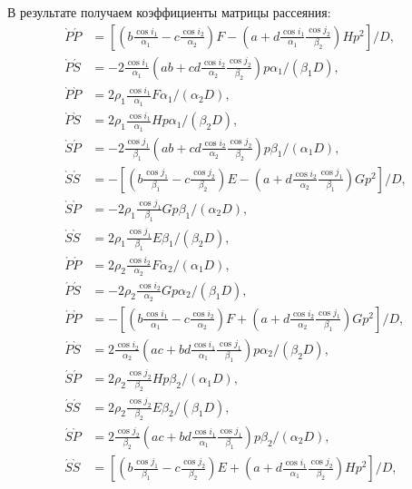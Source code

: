 В результате получаем коэффициенты матрицы рассеяния:
\begin{align}
\grave{P}\acute{P} &= [ ( b\frac{\cos{i_1}}{\alpha_1} - c\frac{\cos{i_2}}{\alpha_2} )F - ( a + d\frac{\cos{i_1}}{\alpha_1}\frac{\cos{j_2}}{\beta_2} )Hp^2 ] / D, \nonumber\\
\grave{P}\acute{S} &= -2 \frac{\cos{i_1}}{\alpha_1} (ab + cd \frac{\cos{i_2}}{\alpha_2} \frac{\cos{j_2}}{\beta_2} ) p \alpha_1 / (\beta_1 D), \nonumber\\
\grave{P}\grave{P} &= 2 \rho_1 \frac{\cos{i_1}}{\alpha_1} F \alpha_1 / (\alpha_2 D), \nonumber\\
\grave{P}\grave{S} &= 2 \rho_1 \frac{\cos{i_1}}{\alpha_1} H p \alpha_1 / (\beta_2 D), \nonumber\\
\grave{S}\acute{P} &= -2 \frac{\cos{j_1}}{\beta_1} (ab + cd \frac{\cos{i_2}}{\alpha_2} \frac{\cos{j_2}}{\beta_2} ) p \beta_1 / (\alpha_1 D), \nonumber\\
\grave{S}\acute{S} &= - [ ( b\frac{\cos{j_1}}{\beta_1} - c\frac{\cos{j_2}}{\beta_2} )E - ( a + d\frac{\cos{i_2}}{\alpha_2}\frac{\cos{j_1}}{\beta_1} )Gp^2 ] / D, \nonumber\\
\grave{S}\grave{P} &= - 2 \rho_1 \frac{\cos{j_1}}{\beta_1} Gp \beta_1 / (\alpha_2 D), \nonumber\\
\grave{S}\grave{S} &= 2 \rho_1 \frac{\cos{j_1}}{\beta_1} E \beta_1 / (\beta_2 D), \nonumber\\
\acute{P}\acute{P} &= 2 \rho_2 \frac{\cos{i_2}}{\alpha_2} F \alpha_2 / (\alpha_1 D), \nonumber\\
\acute{P}\acute{S} &= - 2 \rho_2 \frac{\cos{i_2}}{\alpha_2} Gp \alpha_2 / (\beta_1 D), \nonumber\\
\acute{P}\grave{P} &= - [ ( b\frac{\cos{i_1}}{\alpha_1} - c\frac{\cos{i_2}}{\alpha_2} )F + ( a + d\frac{\cos{i_2}}{\alpha_2}\frac{\cos{j_1}}{\beta_1} )Gp^2 ] / D, \nonumber\\
\acute{P}\grave{S} &= 2 \frac{\cos{i_2}}{\alpha_2} (ac + bd \frac{\cos{i_1}}{\alpha_1} \frac{\cos{j_1}}{\beta_1} ) p \alpha_2 / (\beta_2 D), \nonumber\\
\acute{S}\acute{P} &= 2 \rho_2 \frac{\cos{j_2}}{\beta_2} Hp \beta_2 / (\alpha_1 D), \nonumber\\
\acute{S}\acute{S} &= 2 \rho_2 \frac{\cos{j_2}}{\beta_2} E \beta_2 / (\beta_1 D), \nonumber\\
\acute{S}\grave{P} &= 2 \frac{\cos{j_2}}{\beta_2} (ac + bd \frac{\cos{i_1}}{\alpha_1} \frac{\cos{j_1}}{\beta_1} ) p \beta_2 / (\alpha_2 D), \nonumber\\
\acute{S}\grave{S} &= [ ( b\frac{\cos{j_1}}{\beta_1} - c\frac{\cos{j_2}}{\beta_2} )E + ( a + d\frac{\cos{i_1}}{\alpha_1}\frac{\cos{j_2}}{\beta_2} )Hp^2 ] / D,
\end{align}


